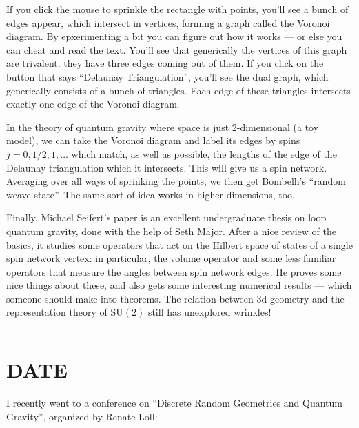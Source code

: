 \documentclass{article}
\def\tightlist{}
\renewcommand{\texttt}[1]{%
  \begingroup
  \ttfamily
  \begingroup\lccode`~=`/\lowercase{\endgroup\def~}{/\discretionary{}{}{}}%
  \begingroup\lccode`~=`[\lowercase{\endgroup\def~}{[\discretionary{}{}{}}%
  \begingroup\lccode`~=`.\lowercase{\endgroup\def~}{.\discretionary{}{}{}}%
  \catcode`/=\active\catcode`[=\active\catcode`.=\active
  \scantokens{#1\noexpand}%
  \endgroup
}
\begin{document}
If you click the mouse to sprinkle the rectangle with points, you'll see
a bunch of edges appear, which intersect in vertices, forming a graph
called the Voronoi diagram. By epxerimenting a bit you can figure out
how it works --- or else you can cheat and read the text. You'll see
that generically the vertices of this graph are trivalent: they have
three edges coming out of them. If you click on the button that says
``Delaunay Triangulation'', you'll see the dual graph, which generically
consists of a bunch of triangles. Each edge of these triangles
intersects exactly one edge of the Voronoi diagram.

In the theory of quantum gravity where space is just 2-dimensional (a
toy model), we can take the Voronoi diagram and label its edges by spins
\(j = 0, 1/2, 1, \ldots\) which match, as well as possible, the lengths
of the edge of the Delaunay triangulation which it intersects. This will
give us a spin network. Averaging over all ways of sprinking the points,
we then get Bombelli's ``random weave state''. The same sort of idea
works in higher dimensions, too.

Finally, Michael Seifert's paper is an excellent undergraduate thesis on
loop quantum gravity, done with the help of Seth Major. After a nice
review of the basics, it studies some operators that act on the Hilbert
space of states of a single spin network vertex: in particular, the
volume operator and some less familiar operators that measure the angles
between spin network edges. He proves some nice things about these, and
also gets some interesting numerical results --- which someone should
make into theorems. The relation between 3d geometry and the
representation theory of \(\mathrm{SU}(2)\) still has unexplored
wrinkles!

\begin{center}\rule{0.5\linewidth}{0.5pt}\end{center}
\hypertarget{week172}{%
\section{DATE}\label{week172}}

I recently went to a conference on ``Discrete Random Geometries and
Quantum Gravity'', organized by Renate Loll:

\end{document}
